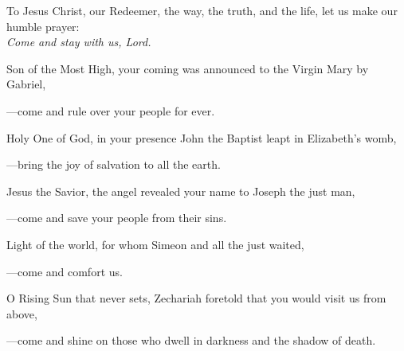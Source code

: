 \intercessions\indent

\begin{hangpar}

To Jesus Christ, our Redeemer, the way, the truth, and the life, let us make our humble prayer:\\
\emph{Come and stay with us, Lord.}

\medskip Son of the Most High, your coming was announced to the Virgin Mary by Gabriel,

{\color{red}---\thinspace}come and rule over your people for ever.

\medskip Holy One of God, in your presence John the Baptist leapt in Elizabeth’s womb,

{\color{red}---\thinspace}bring the joy of salvation to all the earth.

\medskip Jesus the Savior, the angel revealed your name to Joseph the just man,

{\color{red}---\thinspace}come and save your people from their sins.

\medskip Light of the world, for whom Simeon and all the just waited,

{\color{red}---\thinspace}come and comfort us.

\medskip O Rising Sun that never sets, Zechariah foretold that you would visit us from above,

{\color{red}---\thinspace}come and shine on those who dwell in darkness and the shadow of death.

\end{hangpar}